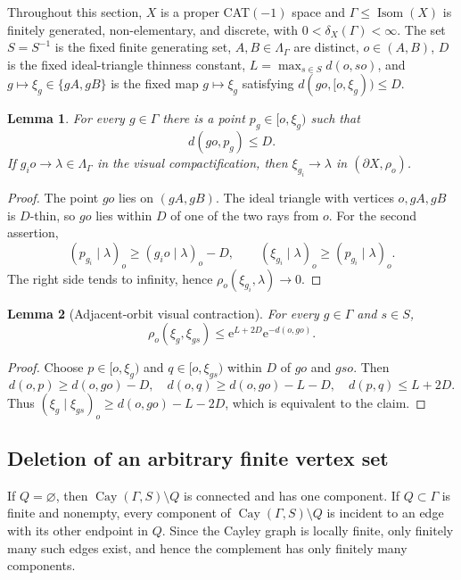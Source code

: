 \documentclass[11pt]{article}
\newtheorem{lemma}[lemma]{Lemma}
\theoremstyle{definition}
\newcommand{\Isom}{\operatorname{Isom}}
\newcommand{\Cay}{\operatorname{Cay}}
\newcommand{\e}{\mathrm e}
\begin{document}
\label{sec:finite-vertex-deletion}
\label{sec:word-ball}
Throughout this section, $X$ is a proper CAT$(-1)$ space and
$\Gamma\le\Isom(X)$ is finitely generated, non-elementary, and discrete, with
$0<\delta_X(\Gamma)<\infty$.  The set $S=S^{-1}$ is the fixed finite generating set,
$A,B\in\Lambda_\Gamma$ are distinct, $o\in(A,B)$, $D$ is the fixed ideal-triangle
thinness constant, $L=\max_{s\in S}d(o,so)$, and $g\mapsto\xi_g\in\{gA,gB\}$ is the
fixed map $g\mapsto\xi_g$ satisfying $d(go,[o,\xi_g))\le D$.

\begin{lemma}
\label{lem:boundary-choice}
For every $g\in\Gamma$ there is a point $p_g\in[o,\xi_g)$ such that
\begin{equation}\label{eq:boundary-choice-shadow}
 d(go,p_g)\le D.
\end{equation}
If $g_i o\to\lambda\in\Lambda_\Gamma$ in the visual compactification, then
$\xi_{g_i}\to\lambda$ in $(\partial X,\rho_o)$.
\end{lemma}

\begin{proof}
The point $go$ lies on $(gA,gB)$.  The ideal triangle with vertices $o,gA,gB$ is $D$-thin,
so $go$ lies within $D$ of one of the two rays from $o$.  For the second assertion,
\[
 (p_{g_i}\mid\lambda)_o\ge(g_i o\mid\lambda)_o-D,
 \qquad
 (\xi_{g_i}\mid\lambda)_o\ge(p_{g_i}\mid\lambda)_o.
\]
The right side tends to infinity, hence $\rho_o(\xi_{g_i},\lambda)\to0$.
\end{proof}

\begin{lemma}[Adjacent-orbit visual contraction]
\label{lem:adjacent-contraction}
For every $g\in\Gamma$ and $s\in S$,
\begin{equation}\label{eq:adjacent-contraction}
 \rho_o(\xi_g,\xi_{gs})\le \e^{L+2D}\e^{-d(o,go)}.
\end{equation}
\end{lemma}

\begin{proof}
Choose $p\in[o,\xi_g)$ and $q\in[o,\xi_{gs})$ within $D$ of $go$ and $gso$.
Then
\[
 d(o,p)\ge d(o,go)-D,
 \quad d(o,q)\ge d(o,go)-L-D,
 \quad d(p,q)\le L+2D.
\]
Thus $(\xi_g\mid\xi_{gs})_o\ge d(o,go)-L-2D$, which is equivalent to the claim.
\end{proof}

\subsection{Deletion of an arbitrary finite vertex set}
If $Q=\varnothing$, then $\Cay(\Gamma,S)\setminus Q$ is connected and has one component.
If $Q\subset\Gamma$ is finite and nonempty, every component of
$\Cay(\Gamma,S)\setminus Q$ is incident to an edge with its other endpoint in $Q$.  Since
the Cayley graph is locally finite, only finitely many such edges exist, and hence the
complement has only finitely many components.
\end{document}
